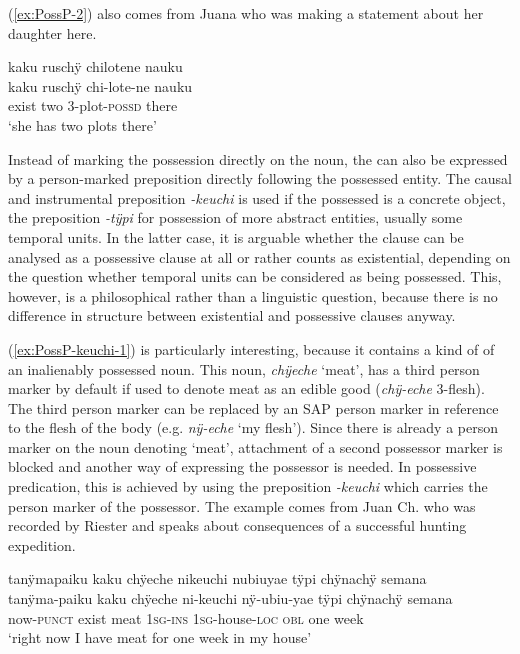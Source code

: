 (\ref{ex:PossP-2}) also comes from Juana who was making a statement about her daughter here.

\ea\label{ex:PossP-2}
\begingl 
\glpreamble kaku ruschÿ chilotene nauku\\
\gla kaku ruschÿ chi-lote-ne nauku\\ 
\glb exist two 3-plot-\textsc{possd} there\\ 
\glft ‘she has two plots there’
\trailingcitation{[jxx-p110923l-1.421]}
\xe

Instead of marking the possession directly on the noun, the  can also be expressed by a person-marked preposition directly following the possessed entity. The causal and instrumental preposition \textit{-keuchi} is used if the possessed is a concrete object, the  preposition \textit{-tÿpi} for possession of more abstract entities, usually some temporal units. In the latter case, it is arguable whether the clause can be analysed as a possessive clause at all or rather counts as existential, depending on the question whether temporal units can be considered as being possessed. This, however, is a philosophical rather than a linguistic question, because there is no difference in structure between existential and possessive clauses anyway.

(\ref{ex:PossP-keuchi-1}) is particularly interesting, because it contains a kind of  of an inalienably possessed noun. This noun, \textit{chÿeche} ‘meat’, has a third person marker by default if used to denote meat as an edible good (\textit{chÿ-eche} 3-flesh). The third person marker can be replaced by an SAP person marker in reference to the flesh of the body (e.g. \textit{nÿ-eche} ‘my flesh’). Since there is already a person marker on the noun denoting ‘meat’, attachment of a second possessor marker is blocked and another way of expressing the possessor is needed. In possessive predication, this is achieved by using the preposition \textit{-keuchi} which carries the person marker of the possessor. The example comes from Juan Ch. who was recorded by Riester and speaks about consequences of a successful hunting expedition.

\ea\label{ex:PossP-keuchi-1}
\begingl 
\glpreamble tanÿmapaiku kaku chÿeche nikeuchi nubiuyae tÿpi chÿnachÿ semana\\
\gla tanÿma-paiku kaku chÿeche ni-keuchi nÿ-ubiu-yae tÿpi chÿnachÿ semana\\ 
\glb now-\textsc{punct} exist meat 1\textsc{sg}-\textsc{ins} 1\textsc{sg}-house-\textsc{loc} \textsc{obl} one week\\ 
\glft ‘right now I have meat for one week in my house’
\trailingcitation{[nxx-a630101g-1.56]}
\xe

